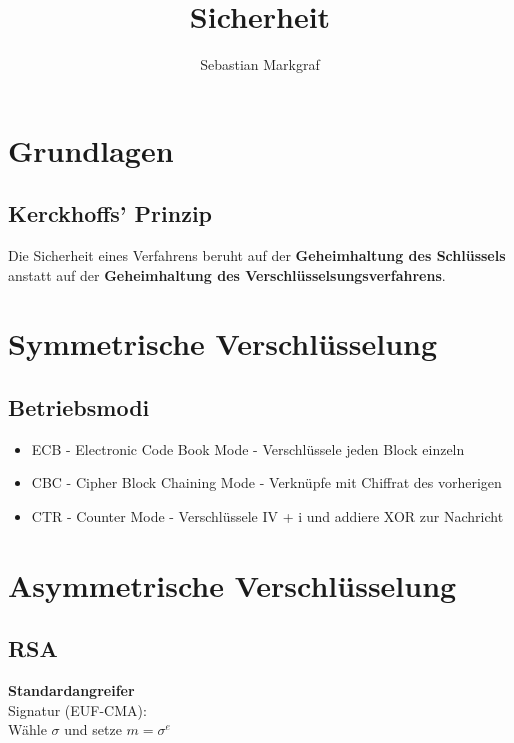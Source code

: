 \documentclass[10pt,a4paper]{article}
\author{Sebastian Markgraf}
\title{Sicherheit}
\begin{document}
	{\let\newpage\relax\maketitle}
	\tableofcontents
	\newpage
	\setcounter{page}{1}

        \section{Grundlagen}
        \subsection{Kerckhoffs' Prinzip}
        Die Sicherheit eines Verfahrens beruht auf der \textbf{Geheimhaltung des Schlüssels}
        anstatt auf der \textbf{Geheimhaltung des Verschlüsselsungsverfahrens}.
        
	\section{Symmetrische Verschlüsselung}
        \subsection{Betriebsmodi}
        \begin{itemize}
        \item ECB - Electronic Code Book Mode - Verschlüssele jeden Block einzeln
        \item CBC - Cipher Block Chaining Mode - Verknüpfe mit Chiffrat des vorherigen
        \item CTR - Counter Mode - Verschlüssele IV + i und addiere XOR zur Nachricht
        \end{itemize}

        \section{Asymmetrische Verschlüsselung}
        \subsection{RSA}
        \textbf{Standardangreifer}\\
        Signatur (EUF-CMA):\\
        Wähle \(\sigma\) und setze \(m = \sigma^e\)
\end{document}
